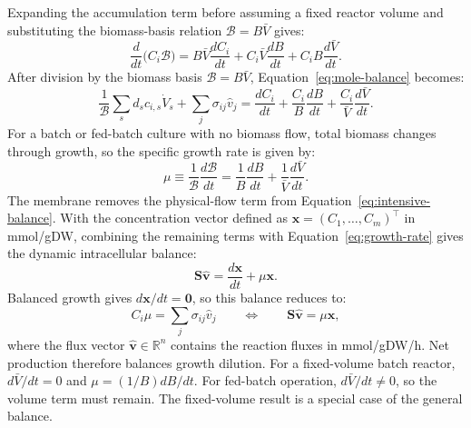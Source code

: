 Expanding the accumulation term before assuming a fixed reactor volume and
substituting the biomass-basis relation $\mathcal B=B\bar V$ gives:
\begin{equation}\label{eq:product-rule}
  \frac{d}{dt}\bigl(C_i\mathcal B\bigr)
  = B\bar V\frac{dC_i}{dt}
  + C_i\bar V\frac{dB}{dt}
  + C_iB\frac{d\bar V}{dt}.
\end{equation}
After division by the biomass basis $\mathcal B=B\bar V$,
Equation~\eqref{eq:mole-balance} becomes:
\begin{equation}\label{eq:intensive-balance}
  \frac{1}{\mathcal B}\sum_s d_s c_{i,s}\dot V_s
  + \sum_j\sigma_{ij}\hat v_j
  = \frac{dC_i}{dt}
  + \frac{C_i}{B}\frac{dB}{dt}
  + \frac{C_i}{\bar V}\frac{d\bar V}{dt}.
\end{equation}
For a batch or fed-batch culture with no biomass flow, total biomass changes
through growth, so the specific growth rate is given by:
\begin{equation}\label{eq:growth-rate}
  \mu \equiv \frac{1}{\mathcal B}\frac{d\mathcal B}{dt}
  = \frac{1}{B}\frac{dB}{dt}
  + \frac{1}{\bar V}\frac{d\bar V}{dt}.
\end{equation}
The membrane removes the physical-flow term from
Equation~\eqref{eq:intensive-balance}. With the concentration vector defined as
$\mathbf x=(C_1,\dots,C_m)^\top$ in mmol/gDW, combining the remaining terms
with Equation~\eqref{eq:growth-rate} gives the dynamic intracellular balance:
\begin{equation}\label{eq:dynamic-flux-balance}
  \mathbf S\hat{\mathbf v}
  = \frac{d\mathbf x}{dt}+\mu\mathbf x.
\end{equation}
Balanced growth gives $d\mathbf x/dt=\mathbf0$, so this balance reduces to:
\begin{equation}\label{eq:dilution-constraint}
  C_i\mu = \sum_j\sigma_{ij}\hat v_j
  \qquad\Longleftrightarrow\qquad
  \boxed{\mathbf S\hat{\mathbf v}=\mu\mathbf x},
\end{equation}
where the flux vector $\hat{\mathbf v}\in\mathbb R^n$ contains the reaction
fluxes in mmol/gDW/h. Net production therefore balances growth dilution. For a
fixed-volume batch reactor, $d\bar V/dt=0$ and
$\mu=(1/B)dB/dt$. For fed-batch operation, $d\bar V/dt\neq0$, so the
volume term must remain. The fixed-volume result is a special case of the
general balance.

